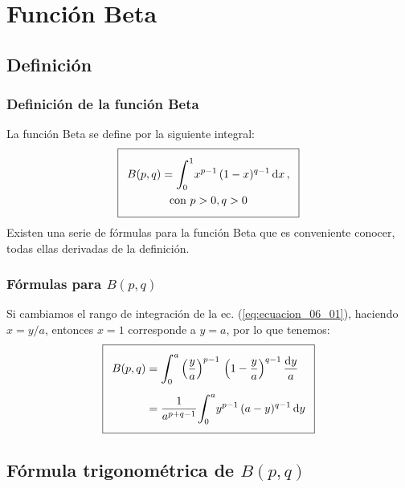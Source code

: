\documentclass[12pt]{beamer}
\begin{document}
\section{Función Beta}
\subsection{Definición}

\begin{frame}[fragile]
\frametitle{Definición de la función Beta}
La función Beta se define por la siguiente integral:
\begin{align} \addtolength{\fboxsep}{5pt}\boxed{
\begin{gathered}
B(p, q) = \scaleint{6ex}_{\bs 0}^{1} x^{p-1} \, (1- x )^{q-1} \dd{x}, \\
\mbox{con }  p > 0, q > 0
\end{gathered}
}
\label{eq:ecuacion_06_01}
\end{align}
\pause
Existen una serie de fórmulas para la función Beta que es conveniente conocer, todas ellas derivadas de la definición.
\end{frame}
\begin{frame}
\frametitle{Fórmulas para $B(p, q)$}
Si cambiamos el rango de integración de la ec. (\ref{eq:ecuacion_06_01}), haciendo $x = y/a$, entonces $x = 1$ corresponde a $y = a$, por lo que tenemos:
\pause
\begin{align} \addtolength{\fboxsep}{5pt}\boxed{
\begin{aligned}
B (p, q) &= \scaleint{6ex}_{\bs 0}^{a} \left( \dfrac{y}{a}\right)^{p-1} \, \left( 1 - \dfrac{y}{a}\right)^{q-1} \dfrac{\dd{y}}{a} \\[0.5em]
&= \dfrac{1}{a^{p+q-1}} \scaleint{6ex}_{\bs 0}^{a} y^{p-1} \, (a - y)^{q-1} \dd{y}
\end{aligned}
\label{eq:ecuacion_06_03}
}
\end{align}
\end{frame}

\subsection{Fórmula trigonométrica de \texorpdfstring{$B (p,q)$}{B (p, q)}}
\end{document}
